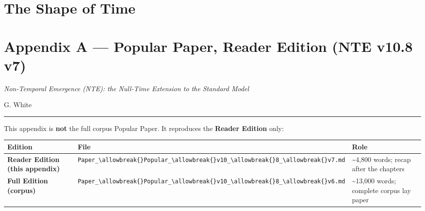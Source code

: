 \documentclass[
  11pt,
]{article}
\author{}
\date{}
\newcounter{none} %
\begin{document}
\section{The Shape of Time}\label{the-shape-of-time}

\section{Appendix A --- Popular Paper, Reader Edition (NTE v10.8
v7)}\label{appendix-a-popular-paper-reader-edition-nte-v10.8-v7}

\emph{Non-Temporal Emergence (NTE): the Null-Time Extension to the
Standard Model}

G. White

\begin{center}\rule{0.5\linewidth}{0.5pt}\end{center}

This appendix is \textbf{not} the full corpus Popular Paper. It
reproduces the \textbf{Reader Edition} only:

{\def\LTcaptype{none} %
\begin{longtable}[]{@{}
  >{\raggedright\arraybackslash}p{}
  >{\raggedright\arraybackslash}p{}
  >{\raggedright\arraybackslash}p{}@{}}
\toprule\noalign{}
\begin{minipage}[b]{\linewidth}\raggedright
Edition
\end{minipage} & \begin{minipage}[b]{\linewidth}\raggedright
File
\end{minipage} & \begin{minipage}[b]{\linewidth}\raggedright
Role
\end{minipage} \\
\midrule\noalign{}
\endhead
\bottomrule\noalign{}
\endlastfoot
\textbf{Reader Edition (this appendix)} &
\texttt{Paper\_\textbackslash{}allowbreak\{\}Popular\_\textbackslash{}allowbreak\{\}v10\_\textbackslash{}allowbreak\{\}8\_\textbackslash{}allowbreak\{\}v7.md}
& \textasciitilde4,800 words; recap after the chapters \\
\textbf{Full Edition (corpus)} &
\texttt{Paper\_\textbackslash{}allowbreak\{\}Popular\_\textbackslash{}allowbreak\{\}v10\_\textbackslash{}allowbreak\{\}8\_\textbackslash{}allowbreak\{\}v6.md}
& \textasciitilde13,000 words; complete corpus lay paper \\
\end{longtable}
}
\end{document}
